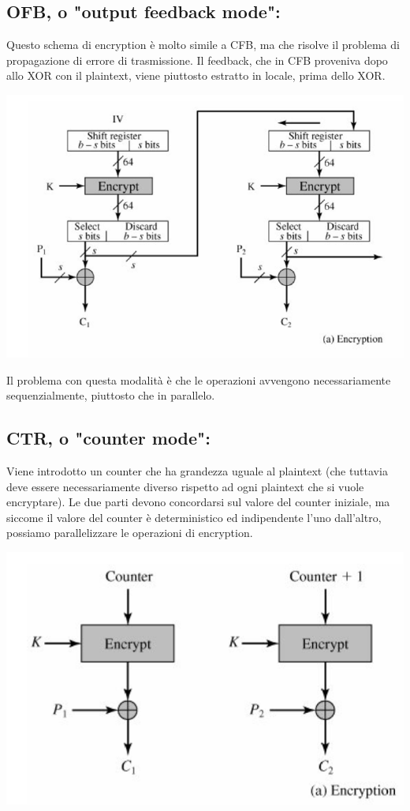 \documentclass[11pt, oneside]{article}   	%
\begin{document}
\subsection*{OFB, o "output feedback mode":}
Questo schema di encryption è molto simile a CFB, ma che risolve il problema di propagazione di errore di trasmissione. Il feedback, che in CFB proveniva dopo allo XOR con il plaintext, viene piuttosto estratto in locale, prima dello XOR.
\begin{center}
\includegraphics[scale= 0.7]{ofb}
\end{center}
Il problema con questa modalità è che le operazioni avvengono necessariamente sequenzialmente, piuttosto che in parallelo. 
\subsection*{CTR, o "counter mode":}
Viene introdotto un counter che ha grandezza uguale al plaintext (che tuttavia deve essere necessariamente diverso rispetto ad ogni plaintext che si vuole encryptare). Le due parti devono concordarsi sul valore del counter iniziale, ma siccome il valore del counter è deterministico ed indipendente l'uno dall'altro, possiamo parallelizzare le operazioni di encryption.
\begin{center}
\includegraphics[scale= 0.7]{ctr}\\
\end{center}
\end{document}
